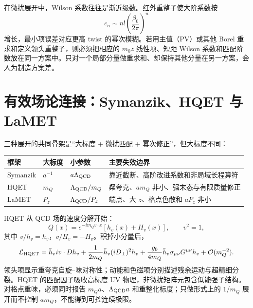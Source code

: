 在微扰展开中，Wilson 系数往往是渐近级数。红外重整子使大阶系数按
\begin{equation}
  c_n\sim n!\left(\frac{\beta_0}{2\pi}\right)^n
  \label{eq:renormalon-growth}
\end{equation}
增长，最小项误差对应更高 twist 的幂次模糊。若用主值（PV）或其他 Borel 重求和定义领头重整子，则必须把相应的 \(m_0z\) 线性项、短距 Wilson 系数和匹配阶数放在同一方案中。只对一个局部分量做重求和、却保持其他分量在另一方案，会人为制造方案差。

\chapter{有效场论连接：Symanzik、HQET 与 LaMET}

三种展开的共同骨架是“大标度 + 微扰匹配 + 幂次修正”，但大标度不同：
\begin{center}
\begin{tabularx}{\textwidth}{L{2.4cm}L{3.2cm}L{3.2cm}Y}
\toprule
框架 & 大标度 & 小参数 & 主要失效边界\\
\midrule
Symanzik & \(a^{-1}\) & \(a\Lambda_{\rm QCD}\) & 靠近截断、高阶改进系数和非局域长程算符\\
HQET & \(m_Q\) & \(\Lambda_{\rm QCD}/m_Q\) & 粲夸克、\(am_Q\) 非小、强末态与有限质量修正\\
LaMET & \(P_z\) & \(\Lambda_{\rm QCD}/P_z\) & 端点、大 \(z\)、格点色散和 \(aP_z\) 非小\\
\bottomrule
\end{tabularx}
\end{center}

HQET 从 QCD 场的速度分解开始：
\begin{equation}
  Q(x)=e^{-im_Qv\cdot x}\left[h_v(x)+H_v(x)\right],
  \qquad v^2=1,
  \label{eq:hqet-decomposition}
\end{equation}
其中 \(v\!\!/h_v=h_v\)，\(v\!\!/H_v=-H_v\)。积掉小分量后，
\begin{equation}
  \mathcal L_{\rm HQET}
  =\bar h_viv\cdot D h_v
  +\frac{1}{2m_Q}\bar h_v(iD_\perp)^2h_v
  +\frac{g_0}{4m_Q}\bar h_v\sigma_{\mu\nu}G^{\mu\nu}h_v
  +\mathcal{O}(m_Q^{-2}).
  \label{eq:hqet-lagrangian}
\end{equation}
领头项显示重夸克自旋--味对称性；动能和色磁项分别描述残余运动与超精细分裂。HQET 的匹配因子吸收高标度 UV 物理，非微扰矩阵元包含低能强子结构。对格点重味，必须同时报告 \(m_Qa\)、\(\Lambda_{\rm QCD}a\) 和重整化标度；只做形式上的 \(1/m_Q\) 展开而不控制 \(am_Q\)，不能得到可控连续极限。

